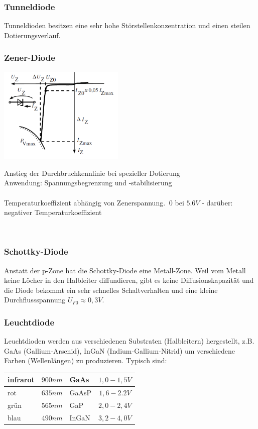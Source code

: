 		\subsubsection{Tunneldiode}
			Tunneldioden besitzen eine sehr hohe Störstellenkonzentration und einen
			steilen Dotierungsverlauf. 
			
		\subsubsection{Zener-Diode}
			\begin{minipage}[c]{6cm}
				\includegraphics[width=6cm]{./images/zdiode-kennlinie.png}
			\end{minipage}
			\begin{minipage}[c]{12cm}
				Anstieg der Durchbruchkennlinie bei spezieller Dotierung \\
				Anwendung: Spannungsbegrenzung und -stabilisierung  \\
				\\
				Temperaturkoeffizient abhängig von Zenerspannung. $~0$ bei $5.6V$ -
				darüber: negativer Temperaturkoeffizient\\
			\end{minipage} \\
			
		\subsubsection{Schottky-Diode}
			Anstatt der p-Zone hat die Schottky-Diode eine Metall-Zone. Weil vom Metall
			keine Löcher in den Halbleiter diffundieren, gibt es keine Diffusionskapazität
			und die Diode bekommt ein sehr schnelles Schaltverhalten und eine kleine
			Durchflussspannung $U_{F0} \approx 0,3V$. \\
			
		\subsubsection{Leuchtdiode}
			Leuchtdioden werden aus verschiedenen Substraten (Halbleitern) hergestellt,
			z.B. GaAs (Gallium-Arsenid), InGaN (Indium-Gallium-Nitrid) um verschiedene
			Farben (Wellenlängen) zu produzieren. Typisch sind: \\
			\begin{tabular}{|l|l|l|c|} \hline
				infrarot & $900nm$ & GaAs & $1,0-1,5V$ \\ \hline
				rot & $635nm$ & GaAsP & $1,6-2.2V$ \\ \hline
				grün & $565nm$ & GaP & $2,0-2,4V$ \\ \hline
				blau & $490nm$ & InGaN & $3,2-4,0V$ \\ \hline
			\end{tabular}\\
			
